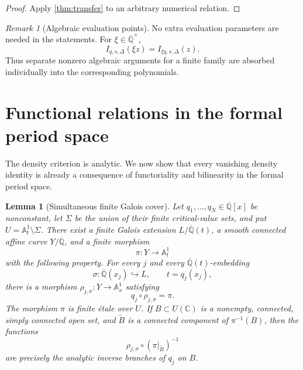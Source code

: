\documentclass[11pt]{article}
\numberwithin{equation}{section}
\newtheorem{lemma}[lemma]{Lemma}
\theoremstyle{definition}
\theoremstyle{remark}
\newtheorem{remark}[remark]{Remark}
\newcommand{\C}{\mathbb C}
\newcommand{\Qbar}{\overline{\mathbb Q}}
\newcommand{\Aone}{\mathbb A^1}
\begin{document}
\begin{proof}
Apply \cref{thm:transfer} to an arbitrary numerical relation.
\end{proof}

\begin{remark}[Algebraic evaluation points]
\label{rem:absorbed-parameters}
No extra evaluation parameters are needed in the statements.  For
$\xi\in\Qbar^\times$,
\[
  I_{q,s,\Delta}(\xi z)=I_{\xi q,s,\Delta}(z).
\]
Thus separate nonzero algebraic arguments for a finite family are absorbed
individually into the corresponding polynomials.
\end{remark}

\section{Functional relations in the formal period space}
\label{sec:formal-relations}

The density criterion is analytic.  We now show that every vanishing density
identity is already a consequence of functoriality and bilinearity in the
formal period space.

\begin{lemma}[Simultaneous finite Galois cover]
\label{lem:simultaneous-cover}
Let $q_1,\ldots,q_N\in\Qbar[x]$ be nonconstant, let $\Sigma$ be the union
of their finite critical-value sets, and put
$U=\Aone_t\setminus\Sigma$.  There exist a finite Galois extension
$L/\Qbar(t)$, a smooth connected affine curve $Y/\Qbar$, and a finite
morphism
\[
  \pi:Y\longrightarrow\Aone_t
\]
with the following property.  For every $j$ and every
$\Qbar(t)$-embedding
\[
  \sigma:\Qbar(x_j)\hookrightarrow L,
  \qquad t=q_j(x_j),
\]
there is a morphism
$\rho_{j,\sigma}:Y\to\Aone_x$ satisfying
\begin{equation}\label{eq:cover-factorization}
  q_j\circ\rho_{j,\sigma}=\pi.
\end{equation}
The morphism $\pi$ is finite \'{e}tale over $U$.
If $B\subset U(\C)$ is a nonempty, connected, simply connected open set,
and $\widetilde B$ is a connected component of $\pi^{-1}(B)$, then the
functions
\[
  \rho_{j,\sigma}\circ
  (\pi|_{\widetilde B})^{-1}
\]
are precisely the analytic inverse branches of $q_j$ on $B$.
\end{lemma}
\end{document}
